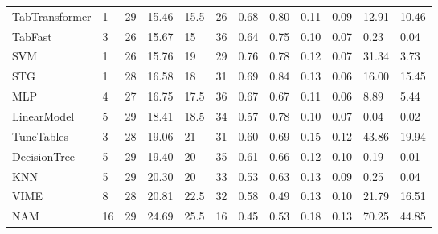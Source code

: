 \begin{tabular}{lllllrllllll}
TabTransformer & 1 & 29 & 15.46 & 15.5 & 26 & 0.68 & 0.80 & 0.11 & 0.09 & 12.91 & 10.46 \\
TabFast & 3 & 26 & 15.67 & 15 & 36 & 0.64 & 0.75 & 0.10 & 0.07 & 0.23 & 0.04 \\
SVM & 1 & 26 & 15.76 & 19 & 29 & 0.76 & 0.78 & 0.12 & 0.07 & 31.34 & 3.73 \\
STG & 1 & 28 & 16.58 & 18 & 31 & 0.69 & 0.84 & 0.13 & 0.06 & 16.00 & 15.45 \\
MLP & 4 & 27 & 16.75 & 17.5 & 36 & 0.67 & 0.67 & 0.11 & 0.06 & 8.89 & 5.44 \\
LinearModel & 5 & 29 & 18.41 & 18.5 & 34 & 0.57 & 0.78 & 0.10 & 0.07 & 0.04 & 0.02 \\
TuneTables & 3 & 28 & 19.06 & 21 & 31 & 0.60 & 0.69 & 0.15 & 0.12 & 43.86 & 19.94 \\
DecisionTree & 5 & 29 & 19.40 & 20 & 35 & 0.61 & 0.66 & 0.12 & 0.10 & 0.19 & 0.01 \\
KNN & 5 & 29 & 20.30 & 20 & 33 & 0.53 & 0.63 & 0.13 & 0.09 & 0.25 & 0.04 \\
VIME & 8 & 28 & 20.81 & 22.5 & 32 & 0.58 & 0.49 & 0.13 & 0.10 & 21.79 & 16.51 \\
NAM & 16 & 29 & 24.69 & 25.5 & 16 & 0.45 & 0.53 & 0.18 & 0.13 & 70.25 & 44.85 \\
\bottomrule
\end{tabular}
